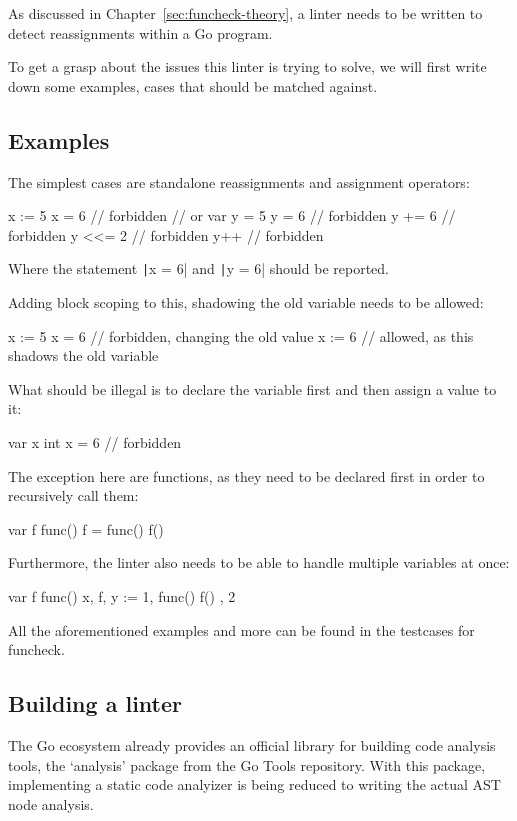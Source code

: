 As discussed in Chapter~\ref{sec:funcheck-theory}, a linter needs to be written
to detect reassignments within a Go program.

To get a grasp about the issues this linter is trying to solve, we will %
first write down some examples, cases that should be matched against.

\subsection{Examples}

The simplest cases are standalone reassignments and assignment operators:
\begin{gocode}
x := 5
x = 6 // forbidden
// or
var y = 5
y = 6   // forbidden
y += 6  // forbidden
y <<= 2 // forbidden
y++     // forbidden
\end{gocode}
Where the statement \texttt|x = 6| and \texttt|y = 6| should be reported.

Adding block scoping to this, shadowing the old variable needs to be allowed:
\begin{gocode}
x := 5
{
	x = 6  // forbidden, changing the old value
	x := 6 // allowed, as this shadows the old variable
}
\end{gocode}
What should be illegal is to declare the variable first and then assign a
value to it:
\begin{gocode}
var x int
x = 6 // forbidden
\end{gocode}
The exception here are functions, as they need to be declared first in order
to recursively call them:
\begin{gocode}
var f func()
f = func() {
	f()
}
\end{gocode}
Furthermore, the linter also needs to be able to handle multiple variables
at once:
\begin{gocode}
var f func()
x, f, y := 1, func() { f() }, 2
\end{gocode}

All the aforementioned examples and more can be found in the testcases for funcheck\autocite{funcheck-examples}.

\subsection{Building a linter}

The Go ecosystem already provides an official library for building code analysis tools,
the `analysis' package from the Go Tools repository\autocite{go-analysis}. With this package,
implementing a static code analyizer is being reduced to writing the actual AST node analysis.

